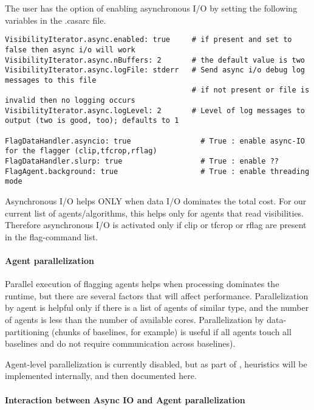 The user has the option of enabling asynchronous I/O by setting the following 
variables in the .casarc file. 

\begin{verbatim}
VisibilityIterator.async.enabled: true     # if present and set to false then async i/o will work
VisibilityIterator.async.nBuffers: 2       # the default value is two
VisibilityIterator.async.logFile: stderr   # Send async i/o debug log messages to this file
                                           # if not present or file is invalid then no logging occurs
VisibilityIterator.async.logLevel: 2       # Level of log messages to output (two is good, too); defaults to 1

FlagDataHandler.asyncio: true                # True : enable async-IO for the flagger (clip,tfcrop,rflag)
FlagDataHandler.slurp: true                  # True : enable ??
FlagAgent.background: true                   # True : enable threading mode
\end{verbatim}

Asynchronous I/O helps ONLY when data I/O dominates the total cost. 
For our current list of agents/algorithms, this helps only for agents that read 
visibilities. Therefore asynchronous I/O is activated only if clip or tfcrop or rflag 
are present in the flag-command list.


\paragraph{Agent parallelization}

Parallel execution of flagging agents helps when processing dominates the runtime, but there
are several factors that will affect performance. 
Parallelization by agent is helpful only if there is a list of agents of similar type, and the number of
agents is less than the number of available cores.  Parallelization by data-partitioning (chunks of
baselines, for example) is useful if all agents touch all baselines and do not require communication
across baselines).

Agent-level parallelization is currently disabled, but as part of 
, heuristics will be implemented internally, and then documented here.



\paragraph{Interaction between Async IO and Agent parallelization}

